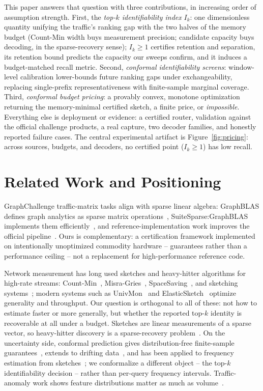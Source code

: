 \documentclass[conference]{IEEEtran}
\begin{document}
This paper answers that question with three contributions, in increasing order of assumption strength. First, the \emph{top-$k$ identifiability index} $I_k$: one dimensionless quantity unifying the traffic's ranking gap with the two halves of the memory budget (Count-Min width buys measurement precision; candidate capacity buys decoding, in the sparse-recovery sense); $I_k\geq1$ certifies retention and separation, its retention bound predicts the capacity our sweeps confirm, and it induces a budget-matched recall metric. Second, \emph{conformal identifiability screens}: window-level calibration lower-bounds future ranking gaps under exchangeability, replacing single-prefix representativeness with finite-sample marginal coverage. Third, \emph{conformal budget pricing}: a provably convex, monotone optimization returning the memory-minimal certified sketch, a finite price, or \emph{impossible}. Everything else is deployment or evidence: a certified router, validation against the official challenge products, a real capture, two decoder families, and honestly reported failure cases. The central experimental artifact is Figure~\ref{fig:pricing}: across sources, budgets, and decoders, no certified point ($I_k\geq1$) has low recall.

\section{Related Work and Positioning}
GraphChallenge traffic-matrix tasks align with sparse linear algebra: GraphBLAS defines graph analytics as sparse matrix operations~\cite{buluc2017graphblas}, SuiteSparse:GraphBLAS implements them efficiently~\cite{davis2019suitesparse}, and reference-implementation work improves the official pipeline~\cite{voloshchuk2026improving}. Ours is complementary: a certification framework implemented on intentionally unoptimized commodity hardware -- guarantees rather than a performance ceiling -- not a replacement for high-performance reference code.

Network measurement has long used sketches and heavy-hitter algorithms for high-rate streams: Count-Min~\cite{cormode2005countmin}, Misra-Gries~\cite{misra1982finding}, SpaceSaving~\cite{metwally2005spacesaving}, and sketching systems~\cite{kumar2004sketching}; modern systems such as UnivMon~\cite{liu2016univmon} and ElasticSketch~\cite{yang2018elastic} optimize generality and throughput. Our question is orthogonal to all of these: not how to estimate faster or more generally, but whether the reported top-$k$ identity is recoverable at all under a budget. Sketches are linear measurements of a sparse vector, so heavy-hitter discovery is a sparse-recovery problem~\cite{gilbert2010sparse}. On the uncertainty side, conformal prediction gives distribution-free finite-sample guarantees~\cite{vovk2005algorithmic}, extends to drifting data~\cite{gibbs2021adaptive}, and has been applied to frequency estimation from sketches~\cite{sesia2022conformal}; we conformalize a different object -- the top-$k$ identifiability decision -- rather than per-query frequency intervals. Traffic-anomaly work shows feature distributions matter as much as volume~\cite{lakhina2005mining}.
\end{document}
